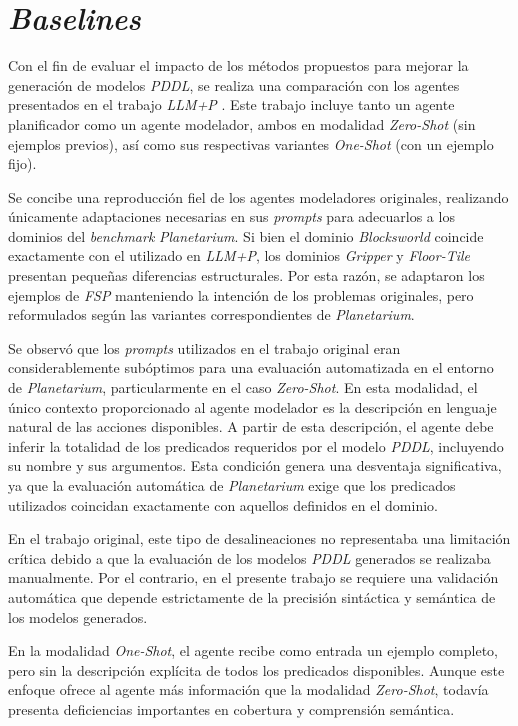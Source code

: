 \section{\textit{Baselines}}

Con el fin de evaluar el impacto de los métodos propuestos para mejorar la generación de modelos \textit{PDDL}, se realiza una comparación con los agentes presentados en el trabajo \textit{LLM+P} \parencite{liu2023llm+}. Este trabajo incluye tanto un agente planificador como un agente modelador, ambos en modalidad \textit{Zero-Shot} (sin ejemplos previos), así como sus respectivas variantes \textit{One-Shot} (con un ejemplo fijo).

Se concibe una reproducción fiel de los agentes modeladores originales, realizando únicamente adaptaciones necesarias en sus \textit{prompts} para adecuarlos a los dominios del \textit{benchmark} \textit{Planetarium}. Si bien el dominio \textit{Blocksworld} coincide exactamente con el utilizado en \textit{LLM+P}, los dominios \textit{Gripper} y \textit{Floor-Tile} presentan pequeñas diferencias estructurales. Por esta razón, se adaptaron los ejemplos de \textit{FSP} manteniendo la intención de los problemas originales, pero reformulados según las variantes correspondientes de \textit{Planetarium}.

Se observó que los \textit{prompts} utilizados en el trabajo original eran considerablemente subóptimos para una evaluación automatizada en el entorno de \textit{Planetarium}, particularmente en el caso \textit{Zero-Shot}. En esta modalidad, el único contexto proporcionado al agente modelador es la descripción en lenguaje natural de las acciones disponibles. A partir de esta descripción, el agente debe inferir la totalidad de los predicados requeridos por el modelo \textit{PDDL}, incluyendo su nombre y sus argumentos. Esta condición genera una desventaja significativa, ya que la evaluación automática de \textit{Planetarium} exige que los predicados utilizados coincidan exactamente con aquellos definidos en el dominio.

En el trabajo original, este tipo de desalineaciones no representaba una limitación crítica debido a que la evaluación de los modelos \textit{PDDL} generados se realizaba manualmente. Por el contrario, en el presente trabajo se requiere una validación automática que depende estrictamente de la precisión sintáctica y semántica de los modelos generados.

En la modalidad \textit{One-Shot}, el agente recibe como entrada un ejemplo completo, pero sin la descripción explícita de todos los predicados disponibles. Aunque este enfoque ofrece al agente más información que la modalidad \textit{Zero-Shot}, todavía presenta deficiencias importantes en cobertura y comprensión semántica.

